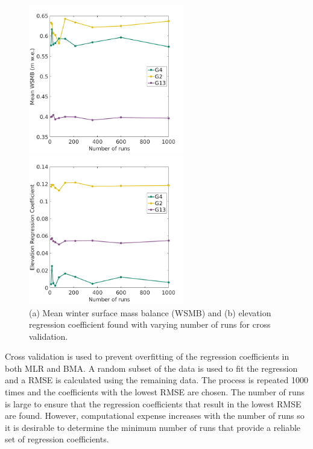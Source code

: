 \documentclass{sfuthesis}
\begin{document}
\begin{figure}
\begin{minipage}[l][8cm][t]{.58\textwidth}
        \vspace*{\fill}
  \centering
  \includegraphics[height=6.5cm]{MLRrunWSMB.png}
  \subcaption{}
\end{minipage}%
\begin{minipage}[l][8cm][t]{.38\textwidth}
        \vspace*{\fill} 
          \centering
         \includegraphics[height=6.5cm]{MLRrunCoeffs.png}
  \subcaption{}
  \end{minipage}%

\caption{(a) Mean winter surface mass balance (WSMB) and (b) elevation regression coefficient found with varying number of runs for cross validation. }
\label{fig:MLRruns}
\end{figure}

Cross validation is used to prevent overfitting of the regression coefficients in both MLR and BMA. A random subset of the data is used to fit the regression and a RMSE is calculated using the remaining data. The process is repeated 1000 times and the coefficients with the lowest RMSE are chosen. The number of runs is large to ensure that the regression coefficients that result in the lowest RMSE are found. However, computational expense increases with the number of runs so it is desirable to determine the minimum number of runs that provide a reliable set of regression coefficients. 
\end{document}
